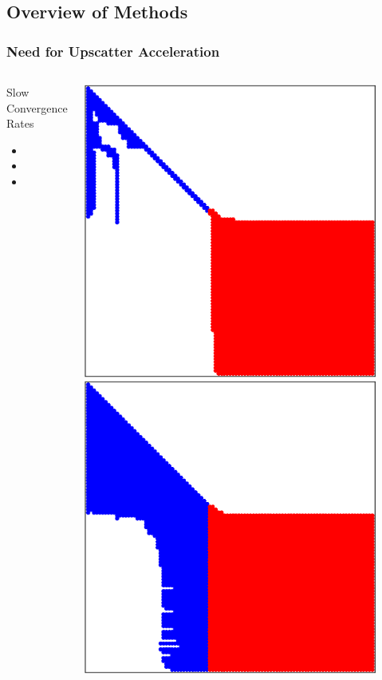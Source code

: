 \documentclass[compress,10pt]{beamer}
\begin{document}
\subsection{Overview of Methods}
\begin{frame}[t]\frametitle{Need for Upscatter Acceleration}
\begin{columns}
\begin{block}{Slow Convergence Rates}
\begin{itemize}
\item
\item
\item
\end{itemize}
\end{block}
\centering
\includegraphics[width=0.9\textwidth]{images/Sparsity_Graphite.eps} \\
\includegraphics[width=0.9\textwidth]{images/Sparsity_HDPE.eps}
\end{columns}
\end{frame}
\end{document}
